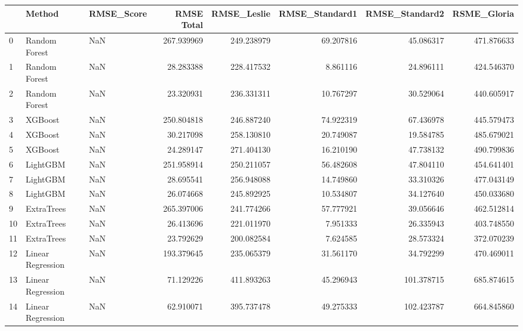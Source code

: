 \begin{tabular}{lllrrrrr}
\toprule
{} &             Method & RMSE\_Score &  RMSE Total &  RMSE\_Leslie &  RMSE\_Standard1 &  RMSE\_Standard2 &  RSME\_Gloria \\
\midrule
0  &      Random Forest &        NaN &  267.939969 &   249.238979 &       69.207816 &       45.086317 &   471.876633 \\
1  &      Random Forest &        NaN &   28.283388 &   228.417532 &        8.861116 &       24.896111 &   424.546370 \\
2  &      Random Forest &        NaN &   23.320931 &   236.331311 &       10.767297 &       30.529064 &   440.605917 \\
3  &            XGBoost &        NaN &  250.804818 &   246.887240 &       74.922319 &       67.436978 &   445.579473 \\
4  &            XGBoost &        NaN &   30.217098 &   258.130810 &       20.749087 &       19.584785 &   485.679021 \\
5  &            XGBoost &        NaN &   24.289147 &   271.404130 &       16.210190 &       47.738132 &   490.799836 \\
6  &           LightGBM &        NaN &  251.958914 &   250.211057 &       56.482608 &       47.804110 &   454.641401 \\
7  &           LightGBM &        NaN &   28.695541 &   256.948088 &       14.749860 &       33.310326 &   477.043149 \\
8  &           LightGBM &        NaN &   26.074668 &   245.892925 &       10.534807 &       34.127640 &   450.033680 \\
9  &         ExtraTrees &        NaN &  265.397006 &   241.774266 &       57.777921 &       39.056646 &   462.512814 \\
10 &         ExtraTrees &        NaN &   26.413696 &   221.011970 &        7.951333 &       26.335943 &   403.748550 \\
11 &         ExtraTrees &        NaN &   23.792629 &   200.082584 &        7.624585 &       28.573324 &   372.070239 \\
12 &  Linear Regression &        NaN &  193.379645 &   235.065379 &       31.561170 &       34.792299 &   470.469011 \\
13 &  Linear Regression &        NaN &   71.129226 &   411.893263 &       45.296943 &      101.378715 &   685.874615 \\
14 &  Linear Regression &        NaN &   62.910071 &   395.737478 &       49.275333 &      102.423787 &   664.845860 \\
\bottomrule
\end{tabular}
